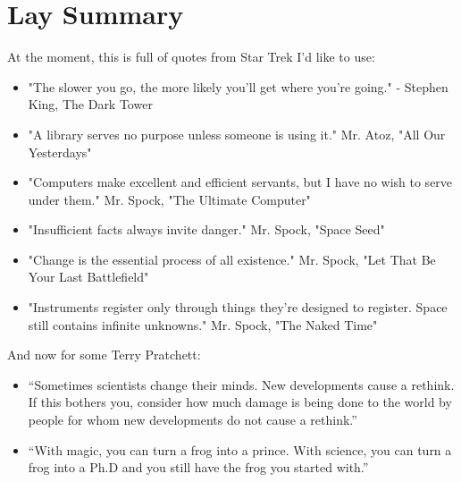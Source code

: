 \chapter{Lay Summary}

At the moment, this is full of quotes from Star Trek I'd like to use:

\begin{itemize}
    \item "The slower you go, the more likely you'll get where you're going." - Stephen King, The Dark Tower
    \item "A library serves no purpose unless someone is using it." Mr. Atoz, "All Our Yesterdays"
    \item "Computers make excellent and efficient servants, but I have no wish to serve under them." Mr. Spock, "The Ultimate Computer"
    \item "Insufficient facts always invite danger." Mr. Spock, "Space Seed"
    \item "Change is the essential process of all existence." Mr. Spock, "Let That Be Your Last Battlefield"
    \item "Instruments register only through things they're designed to register. Space still contains infinite unknowns." Mr. Spock, "The Naked Time"
\end{itemize}

And now for some Terry Pratchett:

\begin{itemize}
    \item “Sometimes scientists change their minds. New developments cause a rethink. If this bothers you, consider how much damage is being done to the world by people for whom new developments do not cause a rethink.”
    \item “With magic, you can turn a frog into a prince. With science, you can turn a frog into a Ph.D and you still have the frog you started with.”
\end{itemize}
